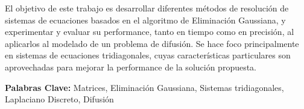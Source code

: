 El objetivo de este trabajo es desarrollar diferentes métodos de resolución de sistemas de ecuaciones basados en el algoritmo de Eliminación Gaussiana, y experimentar y evaluar su performance, tanto en tiempo como en precisión, al aplicarlos al modelado de un problema de difusión. Se hace foco principalmente en sistemas de ecuaciones tridiagonales, cuyas características particulares son aprovechadas para mejorar la performance de la solución propuesta.

\bigbreak

\textbf{Palabras Clave:} Matrices, Eliminación Gaussiana, Sistemas tridiagonales, Laplaciano Discreto, Difusión